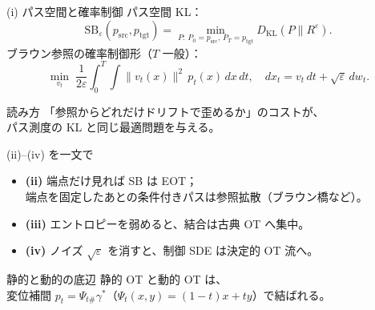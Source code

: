 \asmain
\begin{frame}{(i) パス空間と確率制御}
    パス空間 KL：
    \[
        \mathrm{SB}_\varepsilon(p_{\mathrm{src}},p_{\mathrm{tgt}})
        =
        \min_{P:\,P_0=p_{\mathrm{src}},\,P_T=p_{\mathrm{tgt}}}
        D_{\mathrm{KL}}(P\|R^\varepsilon).
        \tag{7.2.9}
    \]
    ブラウン参照の確率制御形（$T$ 一般）：
    \[
        \min_{v_t}\;
        \frac{1}{2\varepsilon}
        \int_0^T\!\!\int
        \|v_t(x)\|^2\,p_t(x)\,dx\,dt,
        \quad
        dx_t=v_t\,dt+\sqrt{\varepsilon}\,dw_t.
        \tag{7.2.10}
    \]
    \begin{exampleblock}{読み方}
        「参照からどれだけドリフトで歪めるか」のコストが、\\
        パス測度の KL と同じ最適問題を与える。
    \end{exampleblock}
\end{frame}
\asmain
\begin{frame}{(ii)--(iv) を一文で}
    \begin{itemize}
        \item \textbf{(ii)} 端点だけ見れば SB は EOT；\\
        端点を固定したあとの条件付きパスは参照拡散（ブラウン橋など）。
        \item \textbf{(iii)} エントロピーを弱めると、結合は古典 OT へ集中。
        \item \textbf{(iv)} ノイズ $\sqrt{\varepsilon}$ を消すと、制御 SDE は決定的 OT 流へ。
    \end{itemize}
    \begin{alertblock}{静的と動的の底辺}
        静的 OT と動的 OT は、\\
        変位補間 $p_t=\Psi_{t\#}\gamma^*$（$\Psi_t(x,y)=(1-t)x+ty$）で結ばれる。
    \end{alertblock}
\end{frame}
